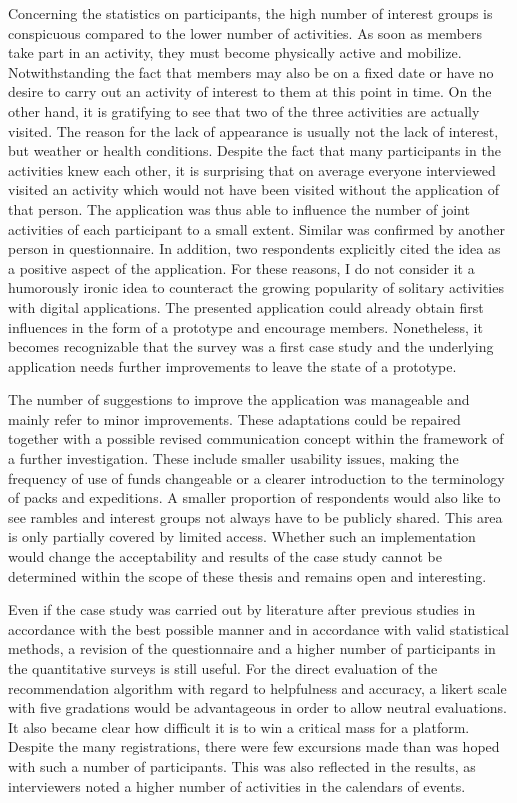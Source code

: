 \documentclass[12pt,numbers=noenddot,parskip,bibliography=totocnumbered,listof=totocnumbered,draft]{scrreprt}
\begin{document}
Concerning the statistics on participants, the high number of interest groups is conspicuous compared to the lower number of activities. As soon as members take part in an activity, they must become physically active and mobilize. Notwithstanding the fact that members may also be on a fixed date or have no desire to carry out an activity of interest to them at this point in time. On the other hand, it is gratifying to see that two of the three activities are actually visited. The reason for the lack of appearance is usually not the lack of interest, but weather or health conditions. Despite the fact that many participants in the activities knew each other, it is surprising that on average everyone interviewed visited an activity which would not have been visited without the application of that person. The application was thus able to influence the number of joint activities of each participant to a small extent. Similar was confirmed by another person in questionnaire. In addition, two respondents explicitly cited the idea as a positive aspect of the application. For these reasons, I do not consider it a humorously ironic idea to counteract the growing popularity of solitary activities with digital applications. The presented application could already obtain first influences in the form of a prototype and encourage members. Nonetheless, it becomes recognizable that the survey was a first case study and the underlying application needs further improvements to leave the state of a prototype. 

The number of suggestions to improve the application was manageable and mainly refer to minor improvements. These adaptations could be repaired together with a possible revised communication concept within the framework of a further investigation. These include smaller usability issues, making the frequency of use of funds changeable or a clearer introduction to the terminology of packs and expeditions. A smaller proportion of respondents would also like to see rambles and interest groups not always have to be publicly shared. This area is only partially covered by limited access. Whether such an implementation would change the acceptability and results of the case study cannot be determined within the scope of these thesis and remains open and interesting.

Even if the case study was carried out by literature after previous studies in accordance with the best possible manner and in accordance with valid statistical methods, a revision of the questionnaire and a higher number of participants in the quantitative surveys is still useful. For the direct evaluation of the recommendation algorithm with regard to helpfulness and accuracy, a likert scale with five gradations would be advantageous in order to allow neutral evaluations. It also became clear how difficult it is to win a critical mass for a platform. Despite the many registrations, there were few excursions made than was hoped with such a number of participants. This was also reflected in the results, as interviewers noted a higher number of activities in the calendars of events. 
\end{document}
